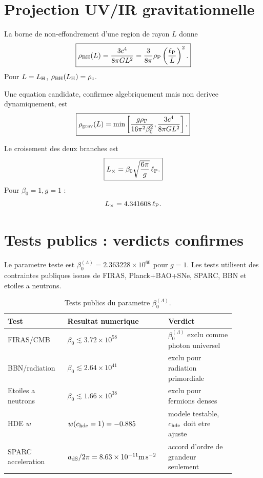 \documentclass[11pt,a4paper]{article}
\newcommand{\lp}{\ell_{\rm P}}
\newcommand{\rhoP}{\rho_{\rm P}}
\newcommand{\rhoC}{\rho_{\rm c}}
\newcommand{\rhoBH}{\rho_{\rm BH}}
\newcommand{\LH}{L_{\rm H}}
\newcommand{\rhograv}{\rho_{\rm grav}}
\begin{document}
\section{Projection UV/IR gravitationnelle}

La borne de non-effondrement d'une region de rayon $L$ donne
\begin{equation}
\boxed{
\rhoBH(L)
=
\frac{3c^4}{8\pi G L^2}
=
\frac{3}{8\pi}\rhoP
\left(\frac{\lp}{L}\right)^2.
}
\label{eq:rho_bh}
\end{equation}
Pour $L=\LH$, $\rhoBH(\LH)=\rhoC$.

Une equation candidate, confirmee algebriquement mais non derivee
dynamiquement, est
\begin{equation}
\boxed{
\rhograv(L)
=
\min\left[
\frac{g\rhoP}{16\pi^2\beta_0^2},
\frac{3c^4}{8\pi G L^2}
\right].
}
\label{eq:min}
\end{equation}

Le croisement des deux branches est
\begin{equation}
\boxed{
L_\times
=
\beta_0\sqrt{\frac{6\pi}{g}}\,\lp.
}
\label{eq:Lcross}
\end{equation}
Pour $\beta_0=1,g=1$ :
\begin{equation}
L_\times=4.341608\,\lp.
\end{equation}

\section{Tests publics : verdicts confirmes}

Le parametre teste est $\beta_0^{(\Lambda)}=2.363228\times10^{60}$ pour
$g=1$. Les tests utilisent des contraintes publiques issues de FIRAS,
Planck+BAO+SNe, SPARC, BBN et etoiles a neutrons.

\begin{table}[h]
\centering
\small
\begin{tabular}{p{0.25\linewidth} p{0.35\linewidth} p{0.28\linewidth}}
\toprule
Test & Resultat numerique & Verdict \\
\midrule
FIRAS/CMB &
$\beta_0\lesssim3.72\times10^{58}$ &
$\beta_0^{(\Lambda)}$ exclu comme photon universel \\
BBN/radiation &
$\beta_0\lesssim2.64\times10^{41}$ &
exclu pour radiation primordiale \\
Etoiles a neutrons &
$\beta_0\lesssim1.66\times10^{38}$ &
exclu pour fermions denses \\
HDE $w$ &
$w(c_{\rm hde}=1)=-0.885$ &
modele testable, $c_{\rm hde}$ doit etre ajuste \\
SPARC acceleration &
$a_{\rm dS}/2\pi=8.63\times10^{-11}{\rm m\,s^{-2}}$ &
accord d'ordre de grandeur seulement \\
\bottomrule
\end{tabular}
\caption{Tests publics du parametre $\beta_0^{(\Lambda)}$.}
\end{table}
\end{document}
